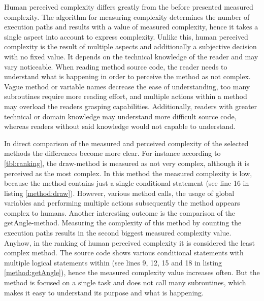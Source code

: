 \documentclass[conference]{IEEEtran}
\newcommand{\lref}[1]{listing \ref{#1}}%
\begin{document}
Human perceived complexity differs greatly from the before presented measured complexity. The algorithm for measuring complexity determines the number of execution paths and results with a value of measured complexity, hence it takes a single aspect into account to express complexity. Unlike this, human perceived complexity is the result of multiple aspects and additionally a subjective decision with no fixed value. It depends on the technical knowledge of the reader and may vary noticeable. When reading method source code, the reader needs to understand what is happening in order to perceive the method as not complex. Vague method or variable names decrease the ease of understanding, too many subroutines require more reading effort, and multiple actions within a method may overload the readers grasping capabilities. Additionally, readers with greater technical or domain knowledge may understand more difficult source code, whereas readers without said knowledge would not capable to understand. 

In direct comparison of the measured and perceived complexity of the selected methods the differences become more clear. For instance according to \cref{tbl:ranking}, the draw-method is measured as not very complex, although it is perceived as the most complex. In this method the measured complexity is low, because the method contains just a single conditional statement (see line 16 in \lref{method:draw}). However, various method calls, the usage of global variables and performing multiple actions subsequently the method appears complex to humans. Another interesting outcome is the comparison of the getAngle-method. Measuring the complexity of this method by counting the execution paths results in the second biggest measured complexity value. Anyhow, in the ranking of human perceived complexity it is considered the least complex method. The source code shows various conditional statements with multiple logical statements within (see lines 9, 12, 15 and 18 in \lref{method:getAngle}), hence the measured complexity value increases often. But the method is focused on a single task and does not call many subroutines, which makes it easy to understand its purpose and what is happening.
\end{document}
